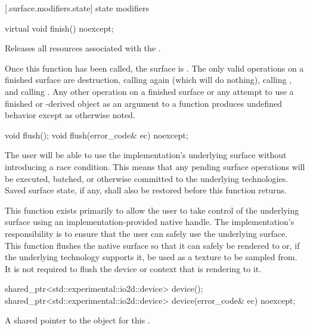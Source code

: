  [\iotwod.surface.modifiers.state] { state modifiers}

\begin{itemdecl}
virtual void finish() noexcept;
\end{itemdecl}
\begin{itemdescr}
	\pnum
	\effects
	Releases all resources associated with the .
	
	\pnum
	\remarks
	Once this function has been called, the surface is . The only valid operations on a finished surface are destruction, calling  again (which will do nothing), calling , and calling . Any other operation on a finished surface or any attempt to use a finished  or -derived object as an argument to a function produces undefined behavior except as otherwise noted.
\end{itemdescr}

\begin{itemdecl}
void flush();
void flush(error_code& ec) noexcept;
\end{itemdecl}
\begin{itemdescr}
	\pnum
	\effects
	The user will be able to use the implementation's underlying surface without introducing a race condition. This means that any pending surface operations will be executed, batched, or otherwise committed to the underlying technologies. Saved surface state, if any, shall also be restored before this function returns.
	
	\pnum
	\remarks
	This function exists primarily to allow the user to take control of the 
	underlying surface using an implementation-provided native handle. The implementation's responsibility is to ensure that the user can safely use the underlying surface.
	\enternote
	This function flushes the native surface so that it can safely be rendered to or, if the underlying technology supports it, be used as a texture to be sampled from. It is not required to flush the device or context that is rendering to it.
	\exitnote
\end{itemdescr}

%
\begin{itemdecl}
shared_ptr<std::experimental::io2d::device> device();
shared_ptr<std::experimental::io2d::device> device(error_code& ec) noexcept;
\end{itemdecl}
\begin{itemdescr}
	\pnum
	\returns
	A shared pointer to the  object for this .	
\end{itemdescr}

